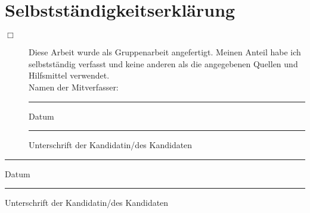\chapter{Selbstständigkeitserklärung}

\begin{description}


\item[$\Box$] Diese Arbeit wurde als Gruppenarbeit angefertigt. Meinen Anteil habe ich selbstständig verfasst und keine anderen als die angegebenen Quellen und Hilfsmittel verwendet.\\

Namen der Mitverfasser:
\vspace{3cm}


\begin{minipage}[t]{3cm}
	\rule{3cm}{0.5pt}
	Datum
\end{minipage}
\hfill
\begin{minipage}[t]{9cm}
	\rule{9cm}{0.5pt}
	Unterschrift der Kandidatin/des Kandidaten
\end{minipage}


\end{description}

\vspace{2cm}

\begin{minipage}[t]{3cm}
	\rule{3cm}{0.5pt}
	Datum
\end{minipage}
\hfill
\begin{minipage}[t]{9cm}
	\rule{9cm}{0.5pt}
	Unterschrift der Kandidatin/des Kandidaten
\end{minipage}
